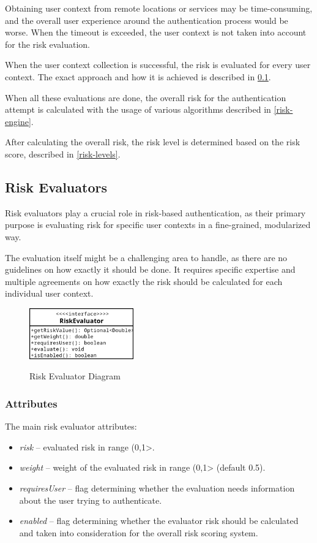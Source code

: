 Obtaining user context from remote locations or services may be time-consuming, and the overall user experience around the authentication process would be worse.
When the timeout is exceeded, the user context is not taken into account for the risk evaluation.

When the user context collection is successful, the risk is evaluated for every user context.
The exact approach and how it is achieved is described in \ref{risk-evaluators}.

When all these evaluations are done, the overall risk for the authentication attempt is calculated with the usage of various algorithms described in \ref{risk-engine}.

After calculating the overall risk, the risk level is determined based on the risk score, described in \ref{risk-levels}.

\newpage
\subsection{Risk Evaluators} \label{risk-evaluators}
Risk evaluators play a crucial role in risk-based authentication, as their primary purpose is evaluating risk for specific user contexts in a fine-grained, modularized way.

The evaluation itself might be a challenging area to handle, as there are no guidelines on how exactly it should be done.
It requires specific expertise and multiple agreements on how exactly the risk should be calculated for each individual user context.

\begin{figure}[htbp]
  \centering
  \includegraphics[width=0.4\textwidth]{img/sections/5-design/riskEvaluator.png}
  \label{fig:design-user-evaluator-diagram}
  \caption{Risk Evaluator Diagram}
\end{figure}

\subsubsection{Attributes}
The main risk evaluator attributes:

\begin{itemize}
    \item \textit{risk} -- evaluated risk in range (0,1>.
    \item \textit{weight} -- weight of the evaluated risk in range (0,1> (default 0.5).
    \item \textit{requiresUser} -- flag determining whether the evaluation needs information about the user trying to authenticate. 
    \item \textit{enabled} -- flag determining whether the evaluator risk should be calculated and taken into consideration for the overall risk scoring system. 
\end{itemize}

